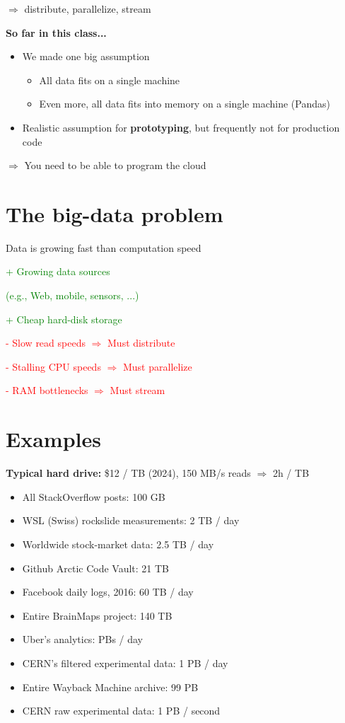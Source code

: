 \documentclass[11pt]{article}
\begin{document}
$\Rightarrow$ distribute, parallelize, stream

\textbf{So far in this class...}

\begin{itemize}
	\item We made one big assumption
		\begin{itemize}
			\item All data fits on a single machine
			\item Even more, all data fits into memory on a single machine (Pandas)
		\end{itemize}
	\item Realistic assumption for \textbf{prototyping}, but frequently not for production code
\end{itemize}
$\Rightarrow$ You need to be able to program the cloud

\section*{The big-data problem}

Data is growing fast than computation speed

\textcolor{green}{+ Growing data sources} 

\hspace{0.5cm}\textcolor{green}{(e.g., Web, mobile, sensors, ...)}

\textcolor{green}{+ Cheap hard-disk storage}

\vspace{0.5cm}

\textcolor{red}{- Slow read speeds $\Rightarrow$ Must distribute}

\textcolor{red}{- Stalling CPU speeds $\Rightarrow$ Must parallelize}

\textcolor{red}{- RAM bottlenecks $\Rightarrow$ Must stream}

\section*{Examples}
\textbf{Typical hard drive:} \$12 / TB (2024), 150 MB/s reads $\Rightarrow$ 2h / TB
\begin{itemize}
	\item All StackOverflow posts: 100 GB
	\item WSL (Swiss) rockslide measurements: 2 TB / day
	\item Worldwide stock-market data: 2.5 TB / day
	\item Github Arctic Code Vault: 21 TB
	\item Facebook daily logs, 2016: 60 TB / day
	\item Entire BrainMaps project: 140 TB
	\item Uber's analytics: PBs / day
	\item CERN's filtered experimental data: 1 PB / day
	\item Entire Wayback Machine archive: 99 PB
	\item CERN raw experimental data: 1 PB / second
\end{itemize}
\end{document}
